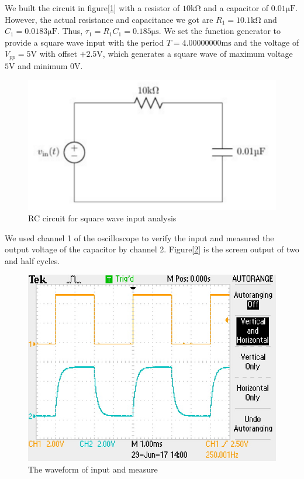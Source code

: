 \hfill \newline
\phantom{ } We built the circuit in figure[\ref{fig:cir}] with a resistor of $10\mathrm{k\Omega}$ and a capacitor of
$0.01\mathrm{\mu F}$. However, the actual resistance and capacitance we got are $R_1=10.1\mathrm{k\Omega}$ and $C_1=0.0183\mathrm{\mu F}$. Thus, $\tau_1 = R_1C_1 = 0.185\mathrm{\mu s}$. \newline
\phantom{ } We set the function generator to provide a square wave input with the period $T=4.00000000\mathrm{ms}$ and the voltage of $V_{pp}=5\mathrm{V}$ with offset $+2.5\mathrm{V}$, which generates a square wave of maximum voltage $5\mathrm{V}$ and minimum $0\mathrm{V}$.

\begin{figure}[!htbp]
	\centering
	\includegraphics[width=\linewidth]{images/1_1.PNG}
	\caption{RC circuit for square wave input analysis}
	\label{fig:cir}
\end{figure}

We used channel 1 of the oscilloscope to verify the input and measured the output voltage of the capacitor by channel 2. Figure[\ref{fig:osc1}] is the screen output of two and half cycles.

\begin{figure}[!htbp]
	\centering
	\includegraphics[width=0.95\linewidth]{images/1_2.JPG}
	\caption{The waveform of input and measure}
	\label{fig:osc1}
\end{figure}

